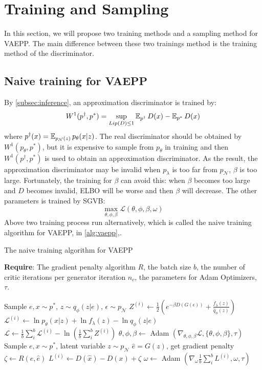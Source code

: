 \section{Training and Sampling}\label{sec:vaepp}
In this section, we will propose two training methods and a sampling method for VAEPP. The main difference between these two trainings method is the training method of the discriminator. 

\subsection{Naive training for VAEPP} \label{subsec:naive_vaepp}
By \cref{subsec:inference}, an approximation discriminator is trained by:
\begin{equation*}
	W^1(p^\dag, p^*) = \sup_{Lip(D) \leq 1} \operatorname{\mathbb{E}}_{p^\dag} D(x) - \operatorname{\mathbb{E}}_{p^*} D(x)
\end{equation*} 
where $p^\dag(x) = \operatorname{\mathbb{E}}_{p_\mathcal{N}(z)} p_\theta(x|z)$. The real discriminator should be obtained by $W^1(p_\theta, p^*)$, but it is expensive to sample from $p_\theta$ in training and then $W^1(p^\dag, p^*)$ is used to obtain an approximation discriminator. As the result, the approximation discriminator may be invalid when $p_\lambda$ is too far from $p_\mathcal{N}$, \IE $\beta$ is too large. Fortunately, the training for $\beta$ can avoid this: when $\beta$ becomes too large and $D$ becomes invalid, ELBO will be worse and then $\beta$ will decrease. The other parameters is trained by SGVB:
\begin{equation*}
	\max_{\theta, \phi, \beta} \mathcal{L}(\theta, \phi, \beta, \omega)
\end{equation*}
Above two training process run alternatively, which is called the naive training algorithm for VAEPP, in \cref{alg:vaepp},. 
\begin{algorithm}[tb]
\caption{The naive training algorithm for VAEPP}
\label{alg:vaepp}
\textbf{Require}: The gradient penalty algorithm $R$, the batch size $b$, the number of critic iterations per generator iteration $n_c$, the parameters for Adam Optimizers, $\tau$. 

\begin{algorithmic}[1] %
\STATE Sample $e, x \sim p^*$, $z \sim q_\phi(z|e)$, $\epsilon \sim p_\mathcal{N}$
\STATE $Z^{(i)} \gets \frac{1}{2}(e^{-\beta D(G(\epsilon))} + \frac{f_\lambda(z)}{\hat{q}_\phi(z)})$
\STATE $\mathcal{L}^{(i)} \gets \ln p_\theta(x|z) + \ln f_\lambda(z) - \ln q_\phi(z|e)$
\ENDFOR
\STATE $\mathcal{L} \gets \frac{1}{b}\sum_{i}^b \mathcal{L}^{(i)} - \ln (\frac{1}{b}\sum_{i}^b Z^{(i)})$
\STATE $\theta, \phi, \beta \gets $ Adam $(\nabla_{\theta, \phi, \beta} \mathcal{L}, \{\theta, \phi, \beta\}, \tau)$
\ENDFOR
{}
\STATE Sample $e, x \sim p^*$, latent variable $z \sim p_\mathcal{N}$
\STATE	$\hat{e} = G(z)$, get gradient penalty $\zeta \gets R(e, \hat{e})$
\STATE $L^{(i)} \gets D(\hat{x}) - D(x) + \zeta$
\ENDFOR
\STATE $\omega \gets $ Adam $(\nabla_{\omega} \frac{1}{b}\sum_{i}^b L^{(i)}, \omega, \tau)$
\ENDWHILE
\end{algorithmic}
\end{algorithm}

